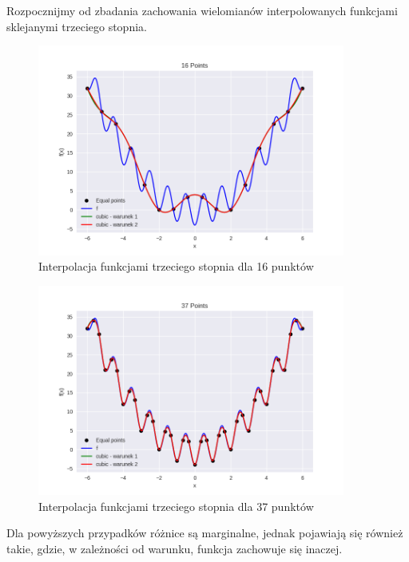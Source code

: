 \documentclass{article}
\begin{document}
Rozpocznijmy od zbadania zachowania wielomianów interpolowanych funkcjami sklejanymi trzeciego stopnia.

\begin{figure}[H]
    \centering
    \includegraphics[width=0.9\textwidth]{img/cubic_16.png}
    \caption{Interpolacja funkcjami trzeciego stopnia dla 16 punktów}
\end{figure}

\begin{figure}[H]
    \centering
    \includegraphics[width=0.9\textwidth]{img/cubic_37.png}
    \caption{Interpolacja funkcjami trzeciego stopnia dla 37 punktów}
\end{figure}

\newpage
Dla powyższych przypadków różnice są marginalne, jednak pojawiają się również takie, gdzie, w zależności od warunku, 
funkcja zachowuje się inaczej.
\end{document}
